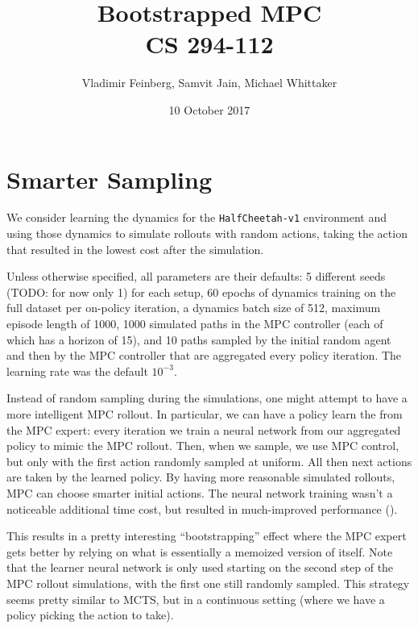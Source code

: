 \documentclass{article}
\title{Bootstrapped MPC\\\large CS 294-112}
\author{Vladimir Feinberg, Samvit Jain, Michael Whittaker}
\date{10 October 2017}
\begin{document}
	
\maketitle

\section{Smarter Sampling}\label{sec:smarter-sampling}

We consider learning the dynamics for the \texttt{HalfCheetah-v1} environment and using those dynamics to simulate rollouts with random actions, taking the action that resulted in the lowest cost after the simulation.

Unless otherwise specified, all parameters are their defaults: 5 different seeds (TODO: for now only 1) for each setup, 60 epochs of dynamics training on the full dataset per on-policy iteration, a dynamics batch size of 512, maximum episode length of 1000, 1000 simulated paths in the MPC controller (each of which has a horizon of 15), and 10 paths sampled by the initial random agent and then by the MPC controller that are aggregated every policy iteration. The learning rate was the default $10^{-3}$.

Instead of random sampling during the simulations, one might attempt to have a more intelligent MPC rollout. In particular, we can have a policy learn the from the MPC expert: every iteration we train a neural network from our aggregated policy to mimic the MPC rollout. Then, when we sample, we use MPC control, but only with the first action randomly sampled at uniform. All then next actions are taken by the learned policy. By having more reasonable simulated rollouts, MPC can choose smarter initial actions. The neural network training wasn't a noticeable additional time cost, but resulted in much-improved performance ().


This results in a pretty interesting ``bootstrapping'' effect where the MPC expert gets better by relying on what is essentially a memoized version of itself. Note that the learner neural network is only used starting on the second step of the MPC rollout simulations, with the first one still randomly sampled. This strategy seems pretty similar to MCTS, but in a continuous setting (where we have a policy picking the action to take).
\end{document}
